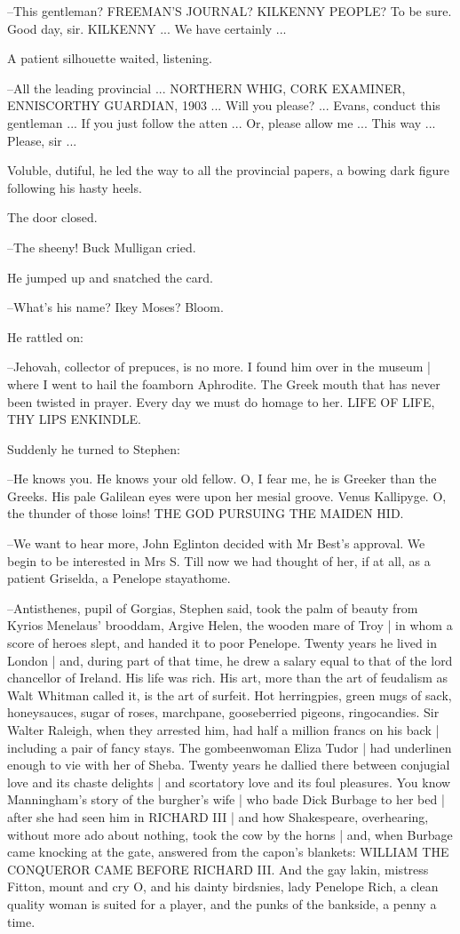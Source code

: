 --This gentleman?
FREEMAN'S JOURNAL?
KILKENNY PEOPLE?
To be sure.
Good day,
sir.
KILKENNY ...
We have certainly ...

A patient silhouette waited,
listening.

--All the leading provincial ...
NORTHERN WHIG,
CORK EXAMINER,
ENNISCORTHY GUARDIAN,
1903 ...
Will you please?
...
Evans,
conduct this gentleman ...
If you just follow the atten ...
Or, please allow me ...
This way ...
Please, sir ...

Voluble, dutiful,
he led the way to all the provincial papers,
a bowing dark figure following his hasty heels.

The door closed.

--The sheeny!
Buck Mulligan cried.

He jumped up and snatched the card.

--What's his name?
Ikey Moses?
Bloom.

He rattled on:

--Jehovah,
collector of prepuces,
is no more.
I found him over in the museum |
where I went to hail the foamborn Aphrodite.
The Greek mouth that has never been twisted in prayer.
Every day we must do homage to her.
LIFE OF LIFE,
THY LIPS ENKINDLE.

Suddenly he turned to Stephen:

--He knows you.
He knows your old fellow.
O, I fear me,
he is Greeker than the Greeks.
His pale Galilean eyes were upon her mesial groove.
Venus Kallipyge.
O, the thunder of those loins!
THE GOD PURSUING THE MAIDEN HID.

--We want to hear more,
John Eglinton decided with Mr Best's approval.
We begin to be interested in Mrs S.
Till now we had thought of her,
if at all,
as a patient Griselda,
a Penelope stayathome.

--Antisthenes, pupil of Gorgias,
Stephen said,
took the palm of beauty from Kyrios Menelaus' brooddam,
Argive Helen, the wooden mare of Troy |
in whom a score of heroes slept,
and handed it to poor Penelope.
Twenty years he lived in London |
and, during part of that time,
he drew a salary equal to that of the lord chancellor of Ireland.
His life was rich.
His art,
more than the art of feudalism as Walt Whitman called it,
is the art of surfeit.
Hot herringpies,
green mugs of sack,
honeysauces,
sugar of roses,
marchpane,
gooseberried pigeons,
ringocandies.
Sir Walter Raleigh,
when they arrested him,
had half a million francs on his back |
including a pair of fancy stays.
The gombeenwoman Eliza Tudor |
had underlinen enough to vie with her of Sheba.
Twenty years he dallied there between conjugial love and its chaste delights |
and scortatory love and its foul pleasures.
You know Manningham's story of the burgher's wife |
who bade Dick Burbage to her bed |
after she had seen him in RICHARD III |
and how Shakespeare,
overhearing,
without more ado about nothing,
took the cow by the horns |
and, when Burbage came knocking at the gate,
answered from the capon's blankets:
WILLIAM THE CONQUEROR CAME BEFORE RICHARD III.
And the gay lakin,
mistress Fitton,
mount and cry O,
and his dainty birdsnies,
lady Penelope Rich,
a clean quality woman is suited for a player,
and the punks of the bankside,
a penny a time.

